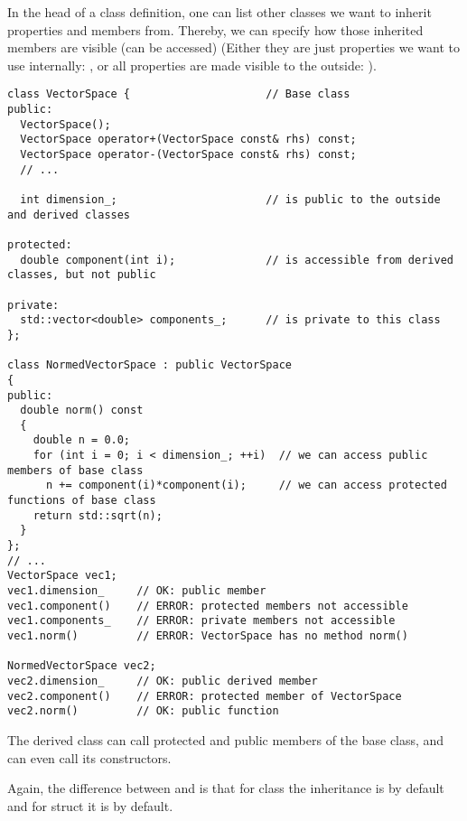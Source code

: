In the head of a class definition, one can list other classes we want to inherit properties and members from. Thereby, we can specify how those inherited members
are visible (can be accessed) (Either they are just properties we want to use internally: , or all properties are made visible to the outside:
).

\begin{verbatim}
class VectorSpace {                     // Base class
public:
  VectorSpace();
  VectorSpace operator+(VectorSpace const& rhs) const;
  VectorSpace operator-(VectorSpace const& rhs) const;
  // ...

  int dimension_;                       // is public to the outside and derived classes

protected:
  double component(int i);              // is accessible from derived classes, but not public

private:
  std::vector<double> components_;      // is private to this class
};

class NormedVectorSpace : public VectorSpace
{
public:
  double norm() const
  {
    double n = 0.0;
    for (int i = 0; i < dimension_; ++i)  // we can access public members of base class
      n += component(i)*component(i);     // we can access protected functions of base class
    return std::sqrt(n);
  }
};
// ...
VectorSpace vec1;
vec1.dimension_     // OK: public member
vec1.component()    // ERROR: protected members not accessible
vec1.components_    // ERROR: private members not accessible
vec1.norm()         // ERROR: VectorSpace has no method norm()

NormedVectorSpace vec2;
vec2.dimension_     // OK: public derived member
vec2.component()    // ERROR: protected member of VectorSpace
vec2.norm()         // OK: public function
\end{verbatim}

The derived class can call protected and public members of the base class, and can even call its constructors.

\begin{rem}
  Again, the difference between  and  is that for class the inheritance is  by default and for struct
  it is  by default.
\end{rem}
